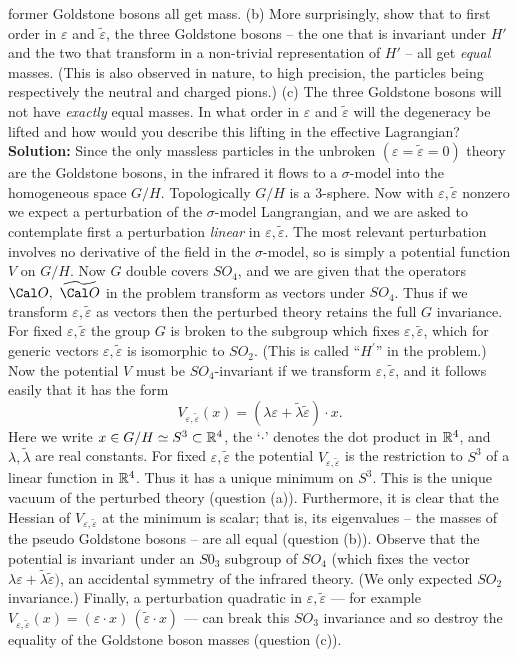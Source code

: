 former Goldstone bosons all get mass.
\medskip
(b)  More surprisingly, show that to first order in
$\varepsilon$ and $\tilde\varepsilon$, the three Goldstone
bosons -- the one that is invariant under $H'$ and the two
that transform in a non-trivial representation of $H'$ --
all get {\it equal} masses.  (This is also observed in
nature, to high precision, the particles being respectively
the neutral and charged pions.)
\medskip
(c)  The three Goldstone bosons will not have {\it exactly}
equal masses.  In what order in $\varepsilon$ and
$\tilde\varepsilon$ will the degeneracy be lifted and how
would you describe this lifting in the effective
Lagrangian?
\bigskip
\noindent
{\bf Solution:}
\medskip
Since the only massless particles in the unbroken
$(\varepsilon=\tilde\varepsilon=0)$ theory are the
Goldstone bosons, in the infrared it flows to a
$\sigma$-model into the homogeneous space $G/H$.
Topologically $G/H$ is a 3-sphere.  Now with
$\varepsilon,\tilde\varepsilon$ nonzero we expect a
perturbation of the $\sigma$-model Langrangian, and we are
asked to contemplate first a perturbation
{\it linear} in $\varepsilon,\tilde\varepsilon$.  The
most relevant perturbation involves no derivative of the
field in the $\sigma$-model, so is simply a potential
function $V$ on $G\slash H$.  Now $G$ double covers $SO_4$,
and we are given that the operators $\Cal O,\,\,\widetilde{\Cal 
O}$ in the problem transform as vectors under $SO_4$.  Thus
if we transform $\varepsilon,\tilde\varepsilon$ as vectors
then the perturbed theory retains the full $G$ invariance.
For fixed $\varepsilon,\tilde\varepsilon$ the group $G$ is
broken to the subgroup which fixes
$\varepsilon,\tilde\varepsilon$, which for generic vectors
$\varepsilon,\tilde\varepsilon$ is isomorphic to $SO_2$.
(This is called ``$H^\prime$'' in the problem.)  
Now the potential
$V$ must be $SO_4$-invariant if we transform
$\varepsilon,\tilde\varepsilon$, and it follows easily that
it has the form
$$
V_{\varepsilon,\tilde\varepsilon}(x)=(\lambda\varepsilon+\tilde
\lambda\tilde\varepsilon)\cdot x.
$$
Here we write $x\in G\slash H\simeq S^3\subset\Bbb R^4$,
the `$\cdot$' denotes the dot product in $\Bbb R^4$, and
$\lambda,\tilde\lambda$ are real constants.   For fixed
$\varepsilon,\tilde\varepsilon$ the potential
$V_{\varepsilon,\tilde\varepsilon}$ is the restriction to
$S^3$ of a linear function in $\Bbb R^4$.  Thus it has a
unique minimum on $S^3$. This is the unique vacuum of the
perturbed theory (question (a)).  Furthermore, it is clear
that the Hessian of $V_{\varepsilon,\tilde\varepsilon}$ at
the minimum is scalar; that is, its eigenvalues -- the
masses of the pseudo Goldstone bosons -- are all equal
(question (b)).  Observe that the potential is invariant
under an $S0_3$ subgroup of $SO_4$ (which fixes the
vector
$\lambda\varepsilon+\tilde\lambda\tilde\varepsilon)$, an
accidental symmetry of the infrared theory.  (We only
expected $SO_2$ invariance.)  Finally, a perturbation
quadratic in $\varepsilon,\tilde\varepsilon$ --- for example
$V_{\varepsilon,\tilde\varepsilon}(x)=(\varepsilon\cdot x)\,(
\tilde\varepsilon\cdot x)$ --- can break this $SO_3$
invariance and so destroy the equality of the Goldstone
boson masses (question (c)).
\vfill\eject

